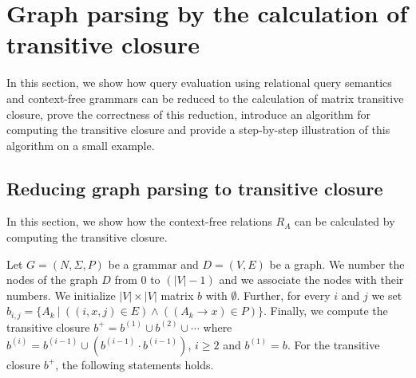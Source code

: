 \section{Graph parsing by the calculation of transitive closure}
In this section, we show how query evaluation using relational query semantics and context-free grammars can be reduced to the calculation of matrix transitive closure, prove the correctness of this reduction, introduce an algorithm for computing the transitive closure and provide a step-by-step illustration of this algorithm on a small example.

\subsection{Reducing graph parsing to transitive closure} \label{section_reducing}
In this section, we show how the context-free relations $R_A$ can be calculated by computing the transitive closure.

Let $G = (N,\Sigma,P)$ be a grammar and $D = (V, E)$ be a graph. We number the nodes of the graph $D$ from 0 to $(|V| - 1)$ and we associate the nodes with their numbers. We initialize $|V| \times |V|$ matrix $b$ with $\emptyset$. Further, for every $i$ and $j$ we set $b_{i,j} = \{A_k~|~((i,x,j) \in E) \wedge ((A_k \rightarrow x) \in P)\}$. Finally, we compute the transitive closure $b^+ = b^{(1)} \cup b^{(2)} \cup \cdots$ where $b^{(i)} = b^{(i-1)} \cup (b^{(i-1)} \cdot b^{(i-1)})$, $i \ge 2$ and $b^{(1)} = b$. For the transitive closure $b^+$, the following statements holds.

